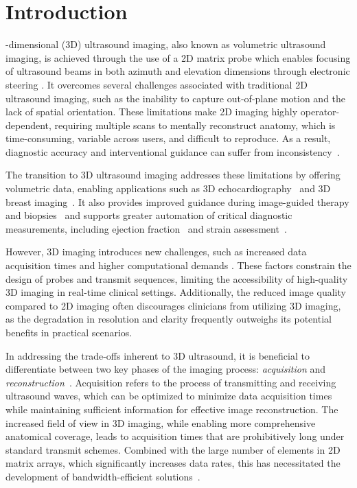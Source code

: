 \documentclass[journal,twoside,web,dvipsnames]{ieeecolor}          %
\begin{document}
\section{Introduction}
\label{sec:introduction}
-dimensional (3D) ultrasound imaging, also known as volumetric ultrasound imaging, is achieved through the use of a 2D matrix probe which enables focusing of ultrasound beams in both azimuth and elevation dimensions through electronic steering \cite{stetten1998real}. It overcomes several challenges associated with traditional 2D ultrasound imaging, such as the inability to capture out-of-plane motion and the lack of spatial orientation. These limitations make 2D imaging highly operator-dependent, requiring multiple scans to mentally reconstruct anatomy, which is time-consuming, variable across users, and difficult to reproduce.  As a result, diagnostic accuracy and interventional guidance can suffer from inconsistency~\cite{nelson1998three, fenster2011three}.

The transition to 3D ultrasound imaging addresses these limitations by offering volumetric data, enabling applications such as 3D echocardiography~\cite{pedrosa2016cardiac, wu2017three, papademetris19993d} and 3D breast imaging~\cite{catalano2023recent}.
It also provides improved guidance during image-guided therapy and biopsies~\cite{fenster20023d} and supports greater automation of critical diagnostic measurements, including ejection fraction~\cite{spitzer2017role} and strain assessment~\cite{de20133d, de20253}.

However, 3D imaging introduces new challenges, such as increased data acquisition times and higher computational demands \cite{huang2017review}. These factors constrain the design of probes and transmit sequences, limiting the accessibility of high-quality 3D imaging in real-time clinical settings. Additionally, the reduced image quality compared to 2D imaging often discourages clinicians from utilizing 3D imaging, as the degradation in resolution and clarity frequently outweighs its potential benefits in practical scenarios.

In addressing the trade-offs inherent to 3D ultrasound, it is beneficial to differentiate between two key phases of the imaging process: \emph{acquisition} and \emph{reconstruction}~\cite{van2024active}. Acquisition refers to the process of transmitting and receiving ultrasound waves, which can be optimized to minimize data acquisition times while maintaining sufficient information for effective image reconstruction. The increased field of view in 3D imaging, while enabling more comprehensive anatomical coverage, leads to acquisition times that are prohibitively long under standard transmit schemes. Combined with the large number of elements in 2D matrix arrays, which significantly increases data rates, this has necessitated the development of bandwidth-efficient solutions~\cite{huang2017review}.
\end{document}
